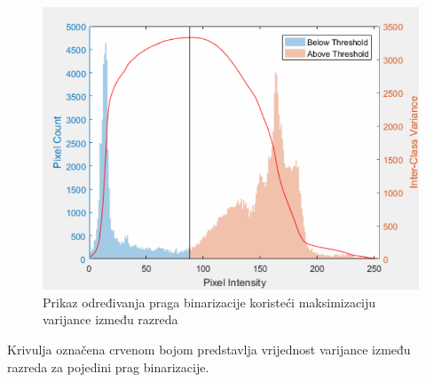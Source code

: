 \documentclass[times, utf8, diplomski]{fer}
\theoremstyle{definition}
\begin{document}
\begin{figure}[h]
\centering
\includegraphics[scale=0.46]{otsu_method.png}
\caption{Prikaz određivanja praga binarizacije koristeći maksimizaciju varijance između razreda}
\end{figure}
Krivulja označena crvenom bojom predstavlja vrijednost varijance između razreda za pojedini prag binarizacije.
\end{document}
